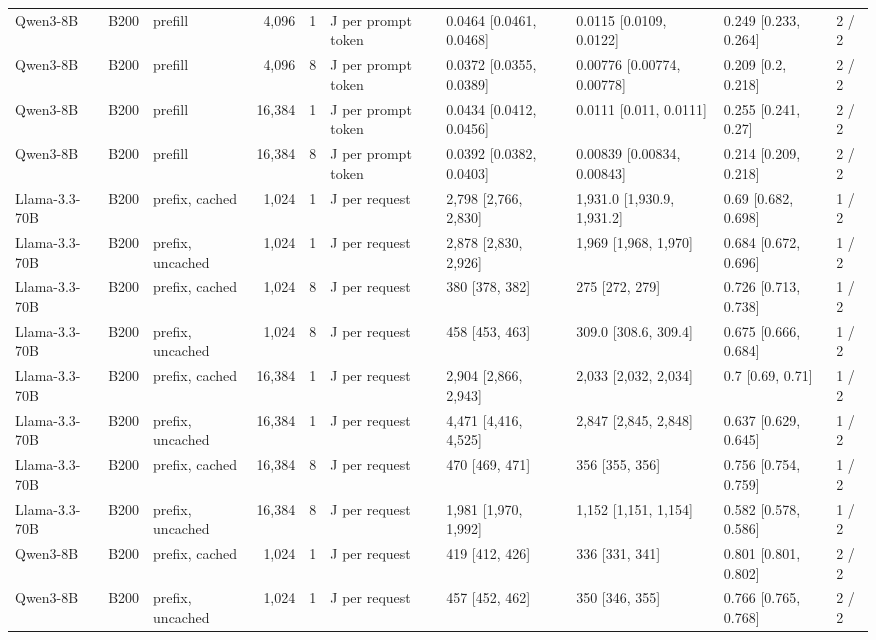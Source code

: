 \begin{landscape}
\begin{longtable}{lllrrlllll}
Qwen3-8B & B200 & prefill & 4,096 & 1 & J per prompt token & 0.0464 {[}0.0461, 0.0468{]} & 0.0115 {[}0.0109, 0.0122{]} & 0.249 {[}0.233, 0.264{]} & 2 / 2 \\
Qwen3-8B & B200 & prefill & 4,096 & 8 & J per prompt token & 0.0372 {[}0.0355, 0.0389{]} & 0.00776 {[}0.00774, 0.00778{]} & 0.209 {[}0.2, 0.218{]} & 2 / 2 \\
Qwen3-8B & B200 & prefill & 16,384 & 1 & J per prompt token & 0.0434 {[}0.0412, 0.0456{]} & 0.0111 {[}0.011, 0.0111{]} & 0.255 {[}0.241, 0.27{]} & 2 / 2 \\
Qwen3-8B & B200 & prefill & 16,384 & 8 & J per prompt token & 0.0392 {[}0.0382, 0.0403{]} & 0.00839 {[}0.00834, 0.00843{]} & 0.214 {[}0.209, 0.218{]} & 2 / 2 \\
Llama-3.3-70B & B200 & prefix, cached & 1,024 & 1 & J per request & 2,798 {[}2,766, 2,830{]} & 1,931.0 {[}1,930.9, 1,931.2{]} & 0.69 {[}0.682, 0.698{]} & 1 / 2 \\
Llama-3.3-70B & B200 & prefix, uncached & 1,024 & 1 & J per request & 2,878 {[}2,830, 2,926{]} & 1,969 {[}1,968, 1,970{]} & 0.684 {[}0.672, 0.696{]} & 1 / 2 \\
Llama-3.3-70B & B200 & prefix, cached & 1,024 & 8 & J per request & 380 {[}378, 382{]} & 275 {[}272, 279{]} & 0.726 {[}0.713, 0.738{]} & 1 / 2 \\
Llama-3.3-70B & B200 & prefix, uncached & 1,024 & 8 & J per request & 458 {[}453, 463{]} & 309.0 {[}308.6, 309.4{]} & 0.675 {[}0.666, 0.684{]} & 1 / 2 \\
Llama-3.3-70B & B200 & prefix, cached & 16,384 & 1 & J per request & 2,904 {[}2,866, 2,943{]} & 2,033 {[}2,032, 2,034{]} & 0.7 {[}0.69, 0.71{]} & 1 / 2 \\
Llama-3.3-70B & B200 & prefix, uncached & 16,384 & 1 & J per request & 4,471 {[}4,416, 4,525{]} & 2,847 {[}2,845, 2,848{]} & 0.637 {[}0.629, 0.645{]} & 1 / 2 \\
Llama-3.3-70B & B200 & prefix, cached & 16,384 & 8 & J per request & 470 {[}469, 471{]} & 356 {[}355, 356{]} & 0.756 {[}0.754, 0.759{]} & 1 / 2 \\
Llama-3.3-70B & B200 & prefix, uncached & 16,384 & 8 & J per request & 1,981 {[}1,970, 1,992{]} & 1,152 {[}1,151, 1,154{]} & 0.582 {[}0.578, 0.586{]} & 1 / 2 \\
Qwen3-8B & B200 & prefix, cached & 1,024 & 1 & J per request & 419 {[}412, 426{]} & 336 {[}331, 341{]} & 0.801 {[}0.801, 0.802{]} & 2 / 2 \\
Qwen3-8B & B200 & prefix, uncached & 1,024 & 1 & J per request & 457 {[}452, 462{]} & 350 {[}346, 355{]} & 0.766 {[}0.765, 0.768{]} & 2 / 2 \\

\end{longtable}
\end{landscape}
